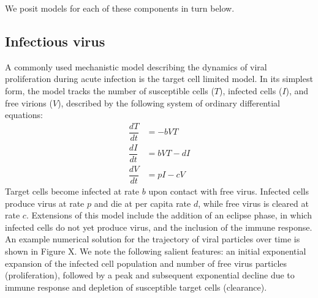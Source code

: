 \documentclass[12pt]{article}
\begin{document}
We posit models for each of these components in turn below.

\subsection{Infectious virus}
A commonly used mechanistic model describing the dynamics of viral proliferation during acute infection is the target cell limited model. In its simplest form, the model tracks the number of susceptible cells ($T$), infected cells ($I$), and free virions ($V$), described by the following system of ordinary differential equations:
\begin{align*}
    \dfrac{dT}{dt}&= -b V T \\
    \dfrac{dI}{dt}&= b V T - d I \\
    \dfrac{dV}{dt}&= p I - c V
\end{align*}
Target cells become infected at rate $b$ upon contact with free virus. Infected cells produce virus at rate $p$ and die at per capita rate $d$, while free virus is cleared at rate $c$. Extensions of this model include the addition of an eclipse phase, in which infected cells do not yet produce virus, and the inclusion of the immune response. An example numerical solution for the trajectory of viral particles over time is shown in Figure X. We note the following salient features: an initial exponential expansion of the infected cell population and number of free virus particles (proliferation), followed by a peak and subsequent exponential decline due to immune response and depletion of susceptible target cells (clearance).
\end{document}
